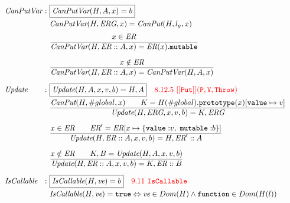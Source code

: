 \documentclass[a4paper, leqno]{amsart}
\def\inred{\color{red}}
\newcommand{\true}{{\tt true}}
\newcommand{\er}{\emph{ER}}
\newcommand{\erg}{\emph{ERG}}
\newcommand{\bool}{\emph{Bool}}
\newcommand{\mkst}[2]{#1::#2}
\newcommand{\rulesep}{\quad\quad}
\newcommand{\semanticrule}[2]{
	\frac{\ensuremath{\begin{matrix}#1\end{matrix}}}
		{\ensuremath{\begin{matrix}#2\end{matrix}}}
}
\begin{document}
{\[\begin{array}{l@{}l@{}ll}
\emph{CanPutVar} & \ : \ & \fbox{$\emph{CanPutVar}(H,A,x) = b$}\\[.5em]
 & \  \ & \emph{CanPutVar}(H,\erg,x) = \emph{CanPut}(H,l_g,x) & \\[.5em]
 & \ \ & \frac{
    \begin{matrix}
       x \in \er
    \end{matrix}}{
    \begin{matrix}
       \emph{CanPutVar}(H,\mkst{\er}{A},x)=\er(x).{\tt mutable}
    \end{matrix}} & \\[1.5em]
 & \ \ & \frac{
    \begin{matrix}
       x \notin \er
    \end{matrix}}{
    \begin{matrix}
       \emph{CanPutVar}(H,\mkst{\er}{A},x)=\emph{CanPutVar}(H,A,x)
    \end{matrix}} & \\[1.5em]

\emph{Update} & \ : \ & \fbox{$\emph{Update}(H,A,x,v,b)=H,A$}
\quad{\inred 8.12.5\ {\tt[[Put]](P, V, Throw)}}\\[.5em]
 & &
\semanticrule
  {\emph{CanPut}(H,\#global,x) \rulesep
   K=H(\#global).{\tt prototype}(x)[{\tt value}\mapsto v]}
  {\emph{Update}(H,\erg,x,v,b)=K,\erg} &
\\[1.5em]
 & &
\semanticrule
   {x \in \er \rulesep
    \er' = \er[x \mapsto \{{\tt value:}v,\ {\tt mutable:}b\}]}
  {\emph{Update}(H,\mkst{\er}{A},x,v,b)=H,\mkst{\er'}{A}} &
\\[1.5em]

 & &
\semanticrule
  {x \notin \er \rulesep
   K,B = \emph{Update}(H,A,x,v,b)}
  {\emph{Update}(H,\mkst{\er}{A},x,v,b)=K,\mkst\er{B}} &
\\[1.5em]

\emph{IsCallable} & \ : \ & \fbox{$\emph{IsCallable}(H,\emph{ve}) = b$}
\quad{\inred 9.11\ {\tt IsCallable}}\\[.5em]
 & \  \ & \emph{IsCallable}(H,\emph{ve}) =\true \Leftrightarrow \emph{ve}\in Dom(H) \wedge
{\tt function} \in Dom(H(l)) & \\
 & & \\
  \end{array}
\]

}
\end{document}
